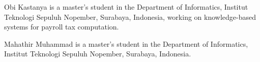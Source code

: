 \documentclass{ieeeaccess}
\begin{document}
\begin{IEEEbiographynophoto}{Obi Kastanya}
is a master's student in the Department of Informatics, Institut Teknologi Sepuluh Nopember, Surabaya, Indonesia, working on knowledge-based systems for payroll tax computation.
\end{IEEEbiographynophoto}

\begin{IEEEbiographynophoto}{Mahathir Muhammad}
is a master's student in the Department of Informatics, Institut Teknologi Sepuluh Nopember, Surabaya, Indonesia.
\end{IEEEbiographynophoto}

\EOD
\end{document}

